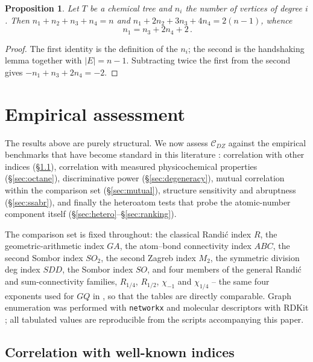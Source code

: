 \documentclass[11pt,a4paper]{article}
\theoremstyle{plain}
\newtheorem{proposition}[theorem]{Proposition}
\theoremstyle{definition}
\theoremstyle{remark}
\newcommand{\CDZ}{\mathcal{C}_{DZ}}
\begin{document}
\begin{proposition}
\label{prop:chemical_degree}
Let $T$ be a chemical tree and $n_i$ the number of vertices of degree $i$. Then
$n_1+n_2+n_3+n_4=n$ and $n_1+2n_2+3n_3+4n_4=2(n-1)$, whence
\[
  \boxed{\,n_1=n_3+2n_4+2\,}.
\]
\end{proposition}

\begin{proof}
The first identity is the definition of the $n_i$; the second is the handshaking
lemma together with $|E|=n-1$. Subtracting twice the first from the second gives
$-n_1+n_3+2n_4=-2$.
\end{proof}

\section{Empirical assessment}
\label{sec:empirical}

The results above are purely structural. We now assess $\CDZ$ against the
empirical benchmarks that have become standard in this literature
\cite{furtula2013,konstantinova1996,kumar2024,oz2025,furtula2025ijmc}:
correlation with other indices (\S\ref{sec:correlation}), correlation with
measured physicochemical properties (\S\ref{sec:octane}), discriminative power
(\S\ref{sec:degeneracy}), mutual correlation within the comparison set
(\S\ref{sec:mutual}), structure sensitivity and abruptness
(\S\ref{sec:ssabr}), and finally the heteroatom tests that probe the
atomic-number component itself (\S\ref{sec:hetero}--\S\ref{sec:ranking}).

The comparison set is fixed throughout: the classical Randi\'c index $R$, the
geometric-arithmetic index $GA$, the atom--bond connectivity index $ABC$, the
second Sombor index $SO_2$, the second Zagreb index $M_2$, the symmetric
division deg index $SDD$, the Sombor index $SO$, and four members of the general
Randi\'c and sum-connectivity families, $R_{1/4}$, $R_{1/2}$, $\chi_{-1}$ and
$\chi_{1/4}$ -- the same four exponents used for $GQ$ in
\cite{furtula2025ijmc}, so that the tables are directly comparable. Graph
enumeration was performed with \texttt{networkx} \cite{hagberg2008} and molecular
descriptors with RDKit \cite{rdkit}; all tabulated values are reproducible from
the scripts accompanying this paper.

\subsection{Correlation with well-known indices}
\label{sec:correlation}
\end{document}

